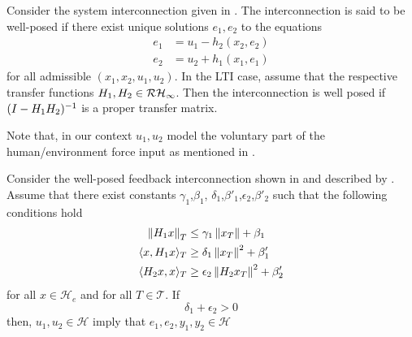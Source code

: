 \begin{define} Consider the system interconnection given in . The interconnection is said to 
be well-posed if there exist unique solutions $e_1,e_2$ to the equations
\begin{align}\label{eq:apdx:passint1}
e_1 &= u_1-h_2(x_2,e_2)\\\label{eq:apdx:passint2}
e_2 &= u_2+h_1(x_1,e_1)
\end{align}
for all admissible $(x_1,x_2,u_1,u_2)$. In the LTI case, assume that the respective transfer functions $H_1,H_2\in\mathcal{RH}_\infty$. Then
the interconnection is well posed if $(I-H_1H_2)^{-1}$ is a proper transfer matrix.
\end{define}

Note that, in our context $u_1,u_2$ model the voluntary part of the human/en\-vi\-ron\-ment force input as mentioned in . 



\begin{thm}Consider the well-posed feedback interconnection shown in  and 
described by . Assume that there exist constants $\gamma_1$,$\beta_1$,
$\delta_1$,$\beta'_1$,$\epsilon_2$,$\beta'_2$ such that the following conditions hold
\begin{align}
\displaystyle \left\| H_1x \right\|_T &\leq \gamma_1\displaystyle \left\| x_T \right\|+\beta_1\\
\langle x,H_1x\rangle_T &\geq \delta_1\displaystyle \left\| x_T \right\|^2+\beta'_1\\
\langle H_2x,x\rangle_T &\geq \epsilon_2\displaystyle \left\| H_2x_T \right\|^2+\beta'_2
\end{align}
for all $x\in\mathcal{H}_e$ and for all $T\in\mathcal{T}$. If 
\begin{equation}
\delta_1+\epsilon_2 >0
\label{eq:apdx:actpas}
\end{equation}
then, $u_1,u_2 \in \mathcal{H}$ imply that $e_1,e_2,y_1,y_2\in\mathcal{H}$ 
\end{thm}

